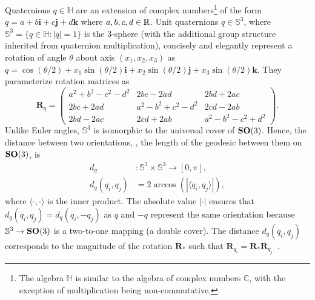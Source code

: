 Quaternions $q \in \mathbb{H}$ are an extension of complex numbers\footnote{The algebra $\mathbb{H}$ is similar to the algebra of complex numbers $\mathbb{C}$, with the exception of multiplication being non-commutative.} of the form $q = a + b\boldsymbol{i} + c\boldsymbol{j} + d\boldsymbol{k}$ where $a,b,c,d \in \mathbb{R}$.
Unit quaternions $q \in \mathbb{S}^3$, where $\mathbb{S}^3 = \big\{ q \in \mathbb{H}: \lvert q \rvert = 1 \big\}$ is the 3-sphere (with the additional group structure inherited from quaternion multiplication), concisely and elegantly represent a rotation of angle $\theta$ about axis $(x_1, x_2, x_3)$ as $q = \cos(\theta/2) + x_1 \sin(\theta/2) \boldsymbol{i} + x_2 \sin(\theta/2) \boldsymbol{j} + x_3 \sin(\theta/2) \boldsymbol{k}$.
They parameterize rotation matrices as
\begin{equation*}
    \mathbf{R}_q =
    \begin{pmatrix}
        a^2+b^2-c^2-d^2 & 2bc-2ad & 2bd+2ac \\
        2bc+2ad & a^2-b^2+c^2-d^2 & 2cd-2ab \\
        2bd-2ac & 2cd+2ab & a^2-b^2-c^2+d^2
    \end{pmatrix}.
\end{equation*}
Unlike Euler angles, $\mathbb{S}^3$ is isomorphic to the universal cover of $\mathrm{\mathbf{SO}}(3)$.
Hence, the distance between two orientations, \ie, the length of the geodesic between them on $\mathrm{\mathbf{SO}}(3)$, is
\begin{equation}
    \begin{aligned}
        d_q &: \mathbb{S}^3 \times \mathbb{S}^3 \rightarrow [0,\pi], \\
        d_q(q_i, q_j) &= 2 \arccos \left( \left| \langle q_i, q_j \rangle \right| \right),
    \label{eqn:distance:orientations}
    \end{aligned}
\end{equation}
where $\langle \cdot, \cdot \rangle$ is the inner product.
The absolute value $\left| \cdot \right|$ ensures that $d_q(q_i, q_j) = d_q(q_i, -q_j)$ as $q$ and $-q$ represent the same orientation because $\mathbb{S}^3 \rightarrow \mathrm{\mathbf{SO}}(3)$ is a two-to-one mapping (a double cover).
The distance $d_q(q_i, q_j)$ corresponds to the magnitude of the rotation $\mathbf{R}_*$ such that $\mathbf{R}_{q_i} = \mathbf{R}_* \mathbf{R}_{q_j}$~\cite{huynh2009metrics}.

